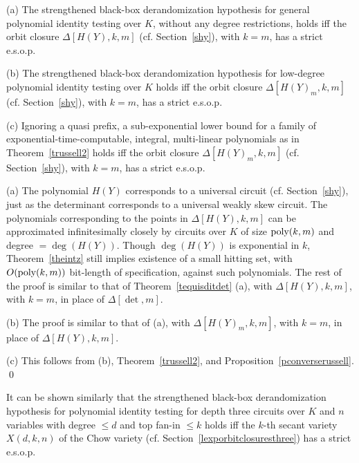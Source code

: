 \documentclass[11pt]{article}
\begin{document}
\begin{theorem}  \label{tequisdit}

\noindent (a) 
The strengthened black-box derandomization hypothesis for general  polynomial identity testing  over $K$,
without any degree restrictions,  holds iff 
the orbit closure $\Delta[H(Y),k,m]$ (cf. Section~\ref{shy}), with $k=m$, has a strict e.s.o.p. 

\noindent (b) 
The strengthened black-box derandomization hypothesis for  low-degree  polynomial identity testing  over $K$  holds
iff  the orbit closure $\Delta[H(Y)_m,k,m]$ (cf. Section~\ref{shy}), with $k=m$, has a strict e.s.o.p. 

\noindent (c) Ignoring a quasi prefix, 
a sub-exponential lower bound for a family of
exponential-time-computable, integral, multi-linear polynomials as in 
Theorem~\ref{trussell2} holds iff 
the orbit closure $\Delta[H(Y)_m,k,m]$ (cf. Section~\ref{shy}), with $k=m$,  has a strict e.s.o.p.
\end{theorem}

\proof 

\noindent (a) The polynomial  $H(Y)$ corresponds to a universal circuit
(cf. Section~\ref{shy}), just as the determinant corresponds  \cite{malod} to a universal
weakly skew circuit. The polynomials corresponding to the points in  $\Delta[H(Y),k,m]$ 
can be approximated infinitesimally closely by circuits over $K$ of size ${\mbox {poly}}(k,m)$ and degree 
$= \deg(H(Y))$. 
Though $\deg(H(Y))$ is exponential in $k$, Theorem~\ref{theintz} still implies existence of a small 
hitting set, with  $O({\mbox {poly}}(k,m))$ bit-length of specification, 
against such  polynomials.
The rest of the proof is similar to that of 
Theorem~\ref{tequisditdet} (a), with 
$\Delta[H(Y),k,m]$, with $k=m$,  in place of $\Delta[\det,m]$.

\noindent (b) The proof is similar to that of (a), with $\Delta[H(Y)_m,k,m]$, with $k=m$,  in place of $\Delta[H(Y),k,m]$.


\noindent (c) This follows from (b), Theorem~\ref{trussell2}, and Proposition~\ref{pconverserussell}.
\qed



It can be shown similarly that 
the strengthened black-box derandomization hypothesis for  polynomial identity 
testing  for depth three circuits over $K$ and $n$ variables with  degree $\le d$ 
and top fan-in $\le k$ holds iff the $k$-th secant variety $X(d,k,n)$ of the Chow variety (cf. 
Section~\ref{lexporbitclosuresthree}) has a strict e.s.o.p.
\end{document}
